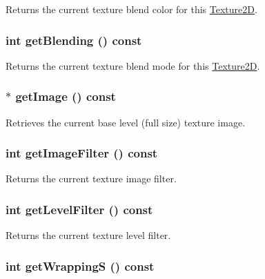 Returns the current texture blend color for this \hyperlink{classm3g_1_1Texture2D}{Texture2D}. \hypertarget{classm3g_1_1Texture2D_078954de3d786bd11dc98b06f237bbbb}{
\subsubsection[{getBlending}]{\setlength{\rightskip}{0pt plus 5cm}int getBlending () const}}
\label{classm3g_1_1Texture2D_078954de3d786bd11dc98b06f237bbbb}


Returns the current texture blend mode for this \hyperlink{classm3g_1_1Texture2D}{Texture2D}. \hypertarget{classm3g_1_1Texture2D_a8c0193b0e7d47d4b5c9f60df24c44f5}{
\subsubsection[{getImage}]{ $\ast$ getImage () const}}
\label{classm3g_1_1Texture2D_a8c0193b0e7d47d4b5c9f60df24c44f5}


Retrieves the current base level (full size) texture image. \hypertarget{classm3g_1_1Texture2D_7b1e1ea0acc3d2096d346afdecc2ea5f}{
\subsubsection[{getImageFilter}]{\setlength{\rightskip}{0pt plus 5cm}int getImageFilter () const}}
\label{classm3g_1_1Texture2D_7b1e1ea0acc3d2096d346afdecc2ea5f}


Returns the current texture image filter. \hypertarget{classm3g_1_1Texture2D_039f7813e846bedec1aaf4c413c15924}{
\subsubsection[{getLevelFilter}]{\setlength{\rightskip}{0pt plus 5cm}int getLevelFilter () const}}
\label{classm3g_1_1Texture2D_039f7813e846bedec1aaf4c413c15924}


Returns the current texture level filter. \hypertarget{classm3g_1_1Texture2D_6bdb583791178dc5002f4d0ae88293a9}{
\subsubsection[{getWrappingS}]{\setlength{\rightskip}{0pt plus 5cm}int getWrappingS () const}}
\label{classm3g_1_1Texture2D_6bdb583791178dc5002f4d0ae88293a9}


